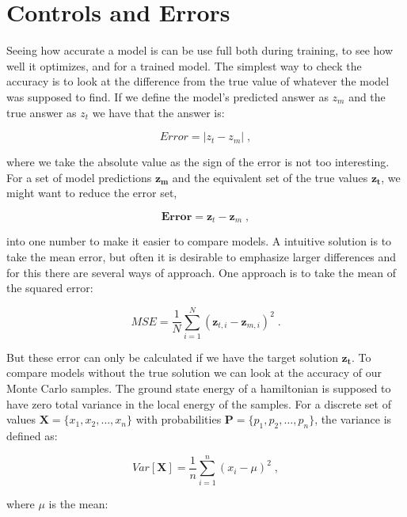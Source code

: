 \section{Controls and Errors}

Seeing how accurate a model is can be use full both during training, to see how well it optimizes, and for a trained model. The simplest way to check the accuracy is to look at the difference from the true value of whatever the model was supposed to find. If we define the model's predicted answer as $z_{m}$ and the true answer as $z_{t}$ we have that the answer is:

\begin{equation}
  Error = |z_t-z_m| \; ,
  \label{eq:theory_error}
\end{equation}

where we take the absolute value as the sign of the error is not too interesting. For a set of model predictions $\boldsymbol{z_m}$ and the equivalent set of the true values $\boldsymbol{z_t}$, we might want to reduce the error set,

$$\textbf{Error} = \boldsymbol{z}_t-\boldsymbol{z}_m \; ,$$

into one number to make it easier to compare models. A intuitive solution is to take the mean error, but often it is desirable to emphasize larger differences and for this there are several ways of approach. One approach is to take the mean of the squared error:

\begin{equation} \label{eq:mse}
    MSE = \frac{1}{N} \sum_{i = 1}^N (\boldsymbol{z}_{t, i} - \boldsymbol{z}_{m, i})^2 \; .
\end{equation}

But these error can only be calculated if we have the target solution $\boldsymbol{z_t}$. To compare models without the true solution we can look at the accuracy of our Monte Carlo samples. The ground state energy of a hamiltonian is supposed to have zero total variance in the local energy of the samples. For a discrete set of values $\boldsymbol{X} = \{x_1, x_2, \dots, x_n\}$ with probabilities $\boldsymbol{P} = \{p_1, p_2, \dots, p_n\}$, the variance is defined as:

\begin{equation}
  Var[\boldsymbol{X}] = \frac{1}{n} \sum_{i=1}^{n} \left (x_i - \mu \right)^2 \; ,
  \label{eq:variance_theory}
\end{equation}

where $\mu$ is the mean:

